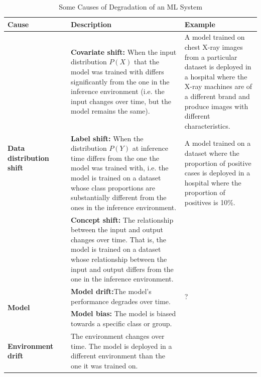 \documentclass[../main.tex]{subfiles}
\begin{document}
    \begin{table}[h]
        \caption{Some Causes of Degradation of an ML System}
        \label{tab:causes_of_ml_degradation}
        \hspace*{-0.7cm}
        \begin{tabular}{p{0.25\linewidth} | p{0.45\linewidth} | p{0.35\linewidth}}
        \toprule
        \textbf{Cause} & \textbf{Description} & \textbf{Example} \\
        \midrule
            \multirow{3}{*}{\small \textbf{Data distribution shift}} & \footnotesize
            \textbf{Covariate shift:} When the input distribution $P(X)$ that the model was trained with differs significantly from the one in the inference environment (i.e. the input changes over time, but the model remains the same). &
            \footnotesize
            A model trained on chest X-ray images from a particular dataset is deployed in a hospital where the X-ray machines are of a different brand and produce images with different characteristics.
            \\
            \cline{2-3} & \footnotesize
            \textbf{Label shift:} When the distribution  $P(Y)$ at inference time differs from the one the model was trained with, i.e. the model is trained on a dataset whose class proportions are substantially different from the ones in the inference environment. &
            \footnotesize
            A model trained on a dataset where the proportion of positive cases is deployed in a hospital where the proportion of positives is 10\%.
            \footnotesize

            \\
            \cline{2-3} & \footnotesize
            \textbf{Concept shift:} \footnotesize The relationship between the input and output changes over time. That is, the model is trained on a dataset whose relationship between the input and output differs from the one in the inference environment. &  \\
        \midrule
        \multirow{2}{*}{\small \textbf{Model}} & \footnotesize
            \textbf{Model drift:}The model's performance degrades over time. 
                & ? \\
            \cline{2-3} & \footnotesize
            \textbf{Model bias:} The model is biased towards a specific class or group. & \\
            \midrule
        \textbf{\small Environment drift} & \footnotesize 
            The environment changes over time. The model is deployed in a different environment than the one it was trained on.  & \\
        \bottomrule
        \end{tabular}
    \end{table}
\end{document}
